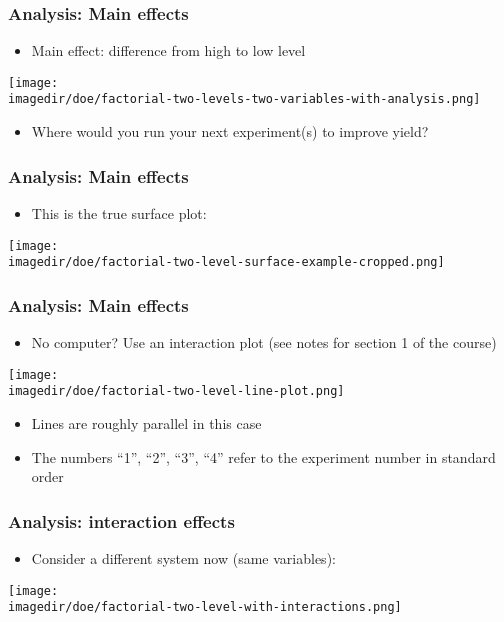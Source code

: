 \begin{frame}\frametitle{Analysis: Main effects}
	\begin{itemize}
		\item	Main effect: difference from high to low level
	\end{itemize}
	\begin{center}
		\texttt{[image: \\imagedir/doe/factorial-two-levels-two-variables-with-analysis.png]}
	\end{center}
	\begin{itemize}
		\item	Where would you run your next experiment(s) to improve yield?
	\end{itemize}
\end{frame}

\begin{frame}\frametitle{Analysis: Main effects}
	\begin{itemize}
		\item	This is the true surface plot:
	\end{itemize}
	\begin{center}
		\texttt{[image: \\imagedir/doe/factorial-two-level-surface-example-cropped.png]}
	\end{center}
\end{frame}

\begin{frame}\frametitle{Analysis: Main effects}
	\begin{itemize}
		\item	No computer? Use an interaction plot {\scriptsize (see notes for section 1 of the course)}
	\end{itemize}
	\begin{center}
		\texttt{[image: \\imagedir/doe/factorial-two-level-line-plot.png]}
	\end{center}
	\begin{itemize}
		\item	Lines are roughly parallel in this case
		\item	The numbers ``1'', ``2'', ``3'', ``4'' refer to the experiment number in standard order
	\end{itemize}
\end{frame}

\begin{frame}\frametitle{Analysis: interaction effects}
	\begin{itemize}
		\item	Consider a different system now (same variables):
	\end{itemize}
	\begin{center}
		\texttt{[image: \\imagedir/doe/factorial-two-level-with-interactions.png]}
	\end{center}
\end{frame}

